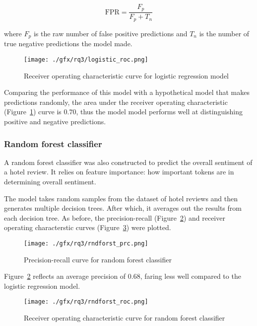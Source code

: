 \documentclass[12pt, a4paper]{pancake-article}
\begin{document}
\begin{equation}
	\text{FPR} = \frac{F_p}{F_p + T_n}
	\label{eq:fpr}
\end{equation}

where $F_p$ is the raw number of false positive predictions and
$T_n$ is the number of true negative predictions the model made.

\begin{figure}
	\centering
	\texttt{[image: ./gfx/rq3/logistic\_roc.png]}
	\caption{Receiver operating characteristic curve for logistic regression model}
	\label{fig:roc-logreg}
\end{figure}

Comparing the performance of this model with a hypothetical
model that makes predictions randomly, the area under the receiver
operating characteristic (Figure~\ref{fig:roc-logreg}) curve is $0.70$,
thus the model model performs well at distinguishing positive and negative predictions.

\subsubsection{Random forest classifier}
A random forest classifier was also constructed to predict
the overall sentiment of a hotel review. It relies on feature
importance: how important tokens are in determining overall sentiment.

The model takes random samples from the dataset of hotel reviews
and then generates multiple decision trees. After which, it averages
out the results from each decision tree. As before, the precision-recall (Figure~\ref{fig:prc-rf})
and receiver operating characterstic curves (Figure~\ref{fig:roc-rf}) were plotted.

\begin{figure}
	\centering
	\texttt{[image: ./gfx/rq3/rndforst\_prc.png]}
	\caption{Precision-recall curve for random forest classifier}
	\label{fig:prc-rf}
\end{figure}

Figure~\ref{fig:prc-rf} reflects an average precision of $0.68$,
faring less well compared to the logistic regression model.

\begin{figure}
	\centering
	\texttt{[image: ./gfx/rq3/rndforst\_roc.png]}
	\caption{Receiver operating characteristic curve for random forest classifier}
	\label{fig:roc-rf}
\end{figure}
\end{document}
